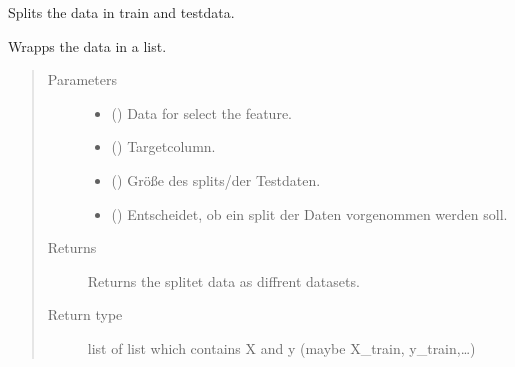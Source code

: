 \documentclass[letterpaper,10pt,english]{sphinxmanual}
\begin{document}

\begin{fulllineitems}
\label{\detokenize{anoog.io:anoog.io.data_io.split_data}}
\sphinxAtStartPar
Splits the data in train and testdata.

\sphinxAtStartPar
Wrapps the data in a list.
\begin{quote}\begin{description}
\item[{Parameters}] \leavevmode\begin{itemize}
\item {} 
\sphinxAtStartPar
{} () \textendash{} Data for select the feature.

\item {} 
\sphinxAtStartPar
{} () \textendash{} Target\sphinxhyphen{}column.

\item {} 
\sphinxAtStartPar
{} () \textendash{} Größe des splits/der Testdaten.

\item {} 
\sphinxAtStartPar
{} () \textendash{} Entscheidet, ob ein split der Daten vorgenommen werden soll.

\end{itemize}

\item[{Returns}] \leavevmode
\sphinxAtStartPar
Returns the splitet data as diffrent datasets.

\item[{Return type}] \leavevmode
\sphinxAtStartPar
list of list which contains X and y (maybe X\_train, y\_train,…)

\end{description}\end{quote}

\end{fulllineitems}
\end{document}
